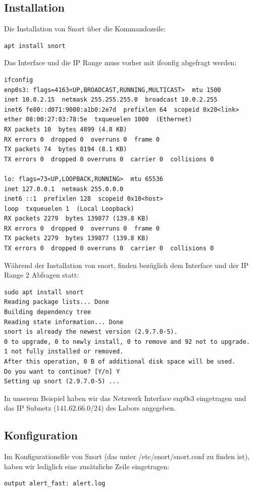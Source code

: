 \documentclass[a4paper]{report}
\begin{document}
\subsection{Installation}
Die Installation von Snort über die Kommandozeile:
\begin{lstlisting}
apt install snort
\end{lstlisting}
Das Interface und die IP Range muss vorher mit ifconfig abgefragt werden:
\begin{lstlisting}
ifconfig
enp0s3: flags=4163<UP,BROADCAST,RUNNING,MULTICAST>  mtu 1500
inet 10.0.2.15  netmask 255.255.255.0  broadcast 10.0.2.255
inet6 fe80::d071:9000:a1b0:2e7d  prefixlen 64  scopeid 0x20<link>
ether 08:00:27:03:78:5e  txqueuelen 1000  (Ethernet)
RX packets 10  bytes 4899 (4.8 KB)
RX errors 0  dropped 0  overruns 0  frame 0
TX packets 74  bytes 8194 (8.1 KB)
TX errors 0  dropped 0 overruns 0  carrier 0  collisions 0

lo: flags=73<UP,LOOPBACK,RUNNING>  mtu 65536
inet 127.0.0.1  netmask 255.0.0.0
inet6 ::1  prefixlen 128  scopeid 0x10<host>
loop  txqueuelen 1  (Local Loopback)
RX packets 2279  bytes 139877 (139.8 KB)
RX errors 0  dropped 0  overruns 0  frame 0
TX packets 2279  bytes 139877 (139.8 KB)
TX errors 0  dropped 0 overruns 0  carrier 0  collisions 0
\end{lstlisting}\newpage
Während der Installation von snort, finden bezüglich dem Interface und der IP Range 2 Abfragen statt:
\begin{lstlisting}
sudo apt install snort
Reading package lists... Done
Building dependency tree      
Reading state information... Done
snort is already the newest version (2.9.7.0-5).
0 to upgrade, 0 to newly install, 0 to remove and 92 not to upgrade.
1 not fully installed or removed.
After this operation, 0 B of additional disk space will be used.
Do you want to continue? [Y/n] Y
Setting up snort (2.9.7.0-5) ...
\end{lstlisting}
In unserem Beispiel haben wir das Netzwerk Interface enp0s3 eingetragen und das IP Subnetz (141.62.66.0/24) des Labors angegeben.

\subsection{Konfiguration}

Im Konfigurationsfile von Snort (das unter /etc/snort/snort.conf zu finden ist), haben wir lediglich eine zusätzliche Zeile eingetragen:
\begin{lstlisting}
output alert_fast: alert.log
\end{lstlisting}
\end{document}
